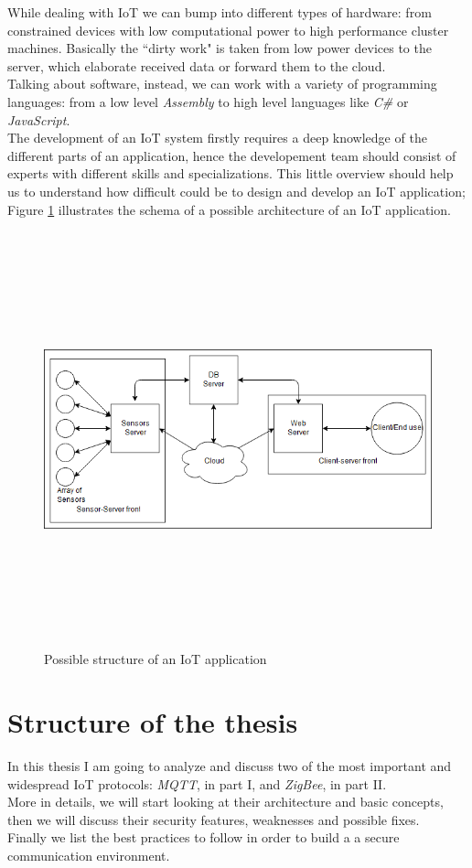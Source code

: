 \documentclass[12pt]{report}
\begin{document}
While dealing with IoT we can bump into different types of hardware: from constrained devices with low computational power to high performance cluster machines. Basically the ``dirty work" is taken from low power devices to the server, which elaborate received data or forward them to the cloud.\\
Talking about software, instead, we can work with a variety of programming languages: from a low level \emph{Assembly} to high level languages like \emph{C\#} or \emph{JavaScript}.\\

The development of an IoT system firstly requires a deep knowledge of the different parts of an application, hence the developement team should consist of experts with different skills and specializations.\newline
This little overview should help us to understand how difficult could be to design and develop an IoT application; Figure \ref{fig:iotstructure} illustrates the schema of a possible architecture of an IoT application.\\

\begin{figure}[H]
\includegraphics[width=13cm,height=12cm,keepaspectratio]{iotapp_architecture}
\caption{Possible structure of an IoT application}
\label{fig:iotstructure}
\end{figure}

\section{Structure of the thesis}
\bigskip
In this thesis I am going to analyze and discuss two of the most important and widespread IoT protocols: \emph{MQTT}, in part I, and \emph{ZigBee}, in part II.\\
More in details, we will start looking at their architecture and basic concepts, then we will discuss their security features, weaknesses and possible fixes.\\
Finally we list the best practices to follow in order to build a a secure communication environment.\\
\end{document}
